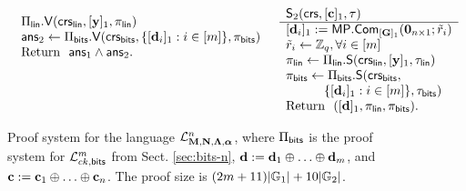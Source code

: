 \begin{figure}
\begin{\algSize}
$$\begin{array}{ll}
\begin{array}{l}
    \Pi_{\mathsf{lin}}.\mathsf{V}
    (
        \mathsf{crs}_{\mathsf{lin}},
            [\mathbf{y}]_1,
        \pi_{\mathsf{lin}}
    )\\
\mathsf{ans}_2 \gets \Pi_{\mathsf{bits}}.\mathsf{V}(\mathsf{crs}_{\mathsf{bits}},\{[\mathbf{d}_i]_1:i\in[{m}]\},\pi_{\mathsf{bits}})\\
\text{Return } \ \mathsf{ans}_1\wedge\mathsf{ans}_2.
\\
\\
\\
\\
\end{array}
&
\begin{array}{l}
{\mathsf{S}_2(\mathsf{crs},[\mathbf{c}]_1,\tau)}\\
\hline
{[\mathbf{d}_i]_1} := \mathsf{MP}.\mathsf{Com}_{[\mathbf{{G}}]_1}(\mathbf{{0}}_{n\times 1};\tilde{{r}}_i)\\
\tilde{{r}}_i\gets\mathbb{Z}_q, \forall i\in[{m}]\\
\pi_{\mathsf{lin}} \gets 
    \Pi_{\mathsf{lin}}.\mathsf{S}
    (
        \mathsf{crs}_{\mathsf{lin}},
            [\mathbf{y}]_1,
       \tau_{\mathsf{lin}}
    )\\
\pi_{\mathsf{bits}} \gets
    \Pi_{\mathsf{bits}}.\mathsf{S}
    (
        \mathsf{crs}_{\mathsf{bits}},\\
\qquad\quad  \{[\mathbf{d}_i]_1:i\in[{m}]\},
        \tau_{\mathsf{bits}}
    )\\
\text{Return } \  ([\mathbf{d}]_1,\pi_{\mathsf{lin}},\pi_{\mathsf{bits}}). \\
\end{array}
\end{array}$$
\end{\algSize}
\caption{Proof system for the language $\mathcal{L}_{\mathbf{{M}},\mathbf{{N}},\mathbf{{\Lambda}},{\boldsymbol \alpha}}^n$, where $\Pi_{\mathsf{bits}}$ is the proof system for $\mathcal{L}_{ck,\mathsf{bits}}^m$ from Sect. \ref{sec:bits-n}, $\mathbf{d}:=\mathbf{d}_1\oplus\ldots\oplus\mathbf{d}_{m}$, and $\mathbf{c}:=\mathbf{c}_1\oplus\ldots\oplus\mathbf{c}_n$. The proof size is $(2{m}+11)|\mathbb{G}_1|+10|\mathbb{G}_2|$.\label{fig:bin-leng-nizk}}
\end{figure}
%
